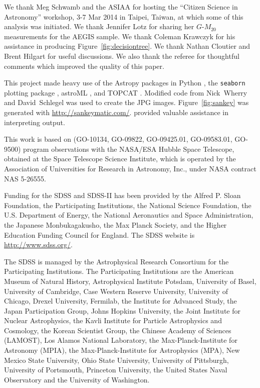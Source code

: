 \documentclass[a4paper,fleqn,usenatbib]{mnras}
\begin{document}
We thank Meg Schwamb and the ASIAA for hosting the ``Citizen Science in
Astronomy'' workshop, 3-7 Mar 2014 in Taipei, Taiwan, at which some of this
analysis was initiated. We thank Jennifer Lotz for sharing her $G$-$M_{20}$
measurements for the AEGIS sample. We thank Coleman Krawczyk for his assistance
in producing Figure~\ref{fig:decisiontree}. We thank Nathan Cloutier and Brent
Hilgart for useful discussions. We also thank the referee for thoughtful comments
which improved the quality of this paper. 

This project made heavy use of the Astropy packages in Python \citep{ast13},
the \texttt{seaborn} plotting package \citep{was15}, astroML \citep{van12}, and
TOPCAT \citep{tay05,tay11}. Modified code from Nick~Wherry and David~Schlegel
was used to create the JPG images. Figure~\ref{fig:sankey} was generated with
\url{http://sankeymatic.com/}. \citet{hol05} provided valuable assistance
in interpreting \sextractor{} output.

This work is based on (GO-10134, GO-09822, GO-09425.01, GO-09583.01, GO-9500)
program observations with the NASA/ESA Hubble Space Telescope, obtained at the
Space Telescope Science Institute, which is operated by the Association of
Universities for Research in Astronomy, Inc., under NASA contract NAS 5-26555. 

Funding for the SDSS and SDSS-II has been provided by the Alfred P. Sloan
Foundation, the Participating Institutions, the National Science Foundation,
the U.S. Department of Energy, the National Aeronautics and Space
Administration, the Japanese Monbukagakusho, the Max Planck Society, and the
Higher Education Funding Council for England. The SDSS website is
\url{http://www.sdss.org/}. 

The SDSS is managed by the Astrophysical Research Consortium for the
Participating Institutions. The Participating Institutions are the American
Museum of Natural History, Astrophysical Institute Potsdam, University of
Basel, University of Cambridge, Case Western Reserve University, University of
Chicago, Drexel University, Fermilab, the Institute for Advanced Study, the
Japan Participation Group, Johns Hopkins University, the Joint Institute for
Nuclear Astrophysics, the Kavli Institute for Particle Astrophysics and
Cosmology, the Korean Scientist Group, the Chinese Academy of Sciences
(LAMOST), Los Alamos National Laboratory, the Max-Planck-Institute for
Astronomy (MPIA), the Max-Planck-Institute for Astrophysics (MPA), New Mexico
State University, Ohio State University, University of Pittsburgh, University
of Portsmouth, Princeton University, the United States Naval Observatory and
the University of Washington. 
\end{document}
